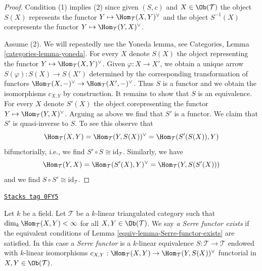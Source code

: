 \begin{proof}
Condition (1) implies (2) since given $(S, c)$ and $X \in \Ob(\mathcal{T})$
the object $S(X)$ represents the functor
$Y \mapsto \Hom_\mathcal{T}(X, Y)^\vee$ and the object $S^{-1}(X)$ corepresents
the functor $Y \mapsto \Hom_\mathcal{T}(Y, X)^\vee$.

\medskip\noindent
Assume (2). We will repeatedly use the Yoneda lemma, see
Categories, Lemma \ref{categories-lemma-yoneda}.
For every $X$ denote $S(X)$ the object representing the
functor $Y \mapsto \Hom_\mathcal{T}(X, Y)^\vee$. Given
$\varphi : X \to X'$, we obtain a unique arrow $S(\varphi) : S(X) \to S(X')$
determined by the corresponding transformation of functors
$\Hom_\mathcal{T}(X, -)^\vee \to \Hom_\mathcal{T}(X', -)^\vee$.
Thus $S$ is a functor and we obtain the isomorphisms $c_{X, Y}$
by construction. It remains to show that $S$ is an equivalence.
For every $X$ denote $S'(X)$ the object corepresenting the
functor $Y \mapsto \Hom_\mathcal{T}(Y, X)^\vee$. Arguing as
above we find that $S'$ is a functor. We claim that $S'$
is quasi-inverse to $S$. To see this observe that
$$
\Hom_\mathcal{T}(X, Y) = \Hom_\mathcal{T}(Y, S(X))^\vee =
\Hom_\mathcal{T}(S'(S(X)), Y)
$$
bifunctorially, i.e., we find $S' \circ S \cong \text{id}_\mathcal{T}$.
Similarly, we have
$$
\Hom_\mathcal{T}(Y, X) = \Hom_\mathcal{T}(S'(X), Y)^\vee =
\Hom_\mathcal{T}(Y, S(S'(X)))
$$
and we find $S \circ S' \cong \text{id}_\mathcal{T}$.
\end{proof}

\begin{definition}
\label{equiv-definition-Serre-functor}
\href{https://stacks.math.columbia.edu/tag/0FY5}{\texttt{Stacks tag 0FY5}}

Let $k$ be a field. Let $\mathcal{T}$ be a $k$-linear
triangulated category such that $\dim_k \Hom_\mathcal{T}(X, Y) < \infty$
for all $X, Y \in \Ob(\mathcal{T})$. We say {\it a Serre functor
exists} if the equivalent conditions of Lemma \ref{equiv-lemma-Serre-functor-exists}
are satisfied. In this case a {\it Serre functor} is a $k$-linear equivalence
$S : \mathcal{T} \to \mathcal{T}$ endowed with $k$-linear isomorphisms
$c_{X, Y} : \Hom_\mathcal{T}(X, Y) \to \Hom_\mathcal{T}(Y, S(X))^\vee$
functorial in $X, Y \in \Ob(\mathcal{T})$.
\end{definition}

